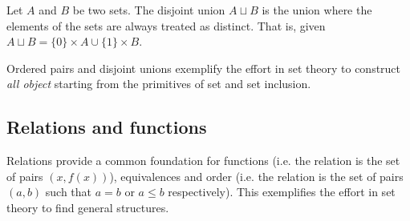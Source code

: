 \documentclass{article}
\begin{document}
\begin{defn}
	Let $A$ and $B$ be two sets. The disjoint union $A \sqcup B$ is the union where the elements of the sets are always treated as distinct. That is, given $A \sqcup B = \{0\} \times A \cup \{1\} \times B$.
\end{defn}

\begin{remark}
	Ordered pairs and disjoint unions exemplify the effort in set theory to construct \emph{all object} starting from the primitives of set and set inclusion.
\end{remark}

\subsection{Relations and functions}

\begin{remark}
	Relations provide a common foundation for functions (i.e. the relation is the set of pairs $(x, f(x))$), equivalences and order (i.e. the relation is the set of pairs $(a, b)$ such that $a=b$ or $a\leq b$ respectively). This exemplifies the effort in set theory to find general structures.
\end{remark}
\end{document}
